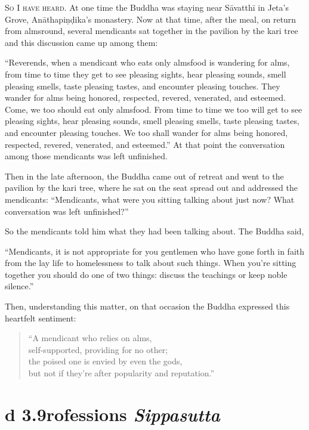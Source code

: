 \documentclass[12pt,openany]{book}%
\newcommand*{\suttatitleacronym}[1]{\smaller[2]{#1}\vspace*{.3em}}
\newcommand*{\suttatitletranslation}[1]{\linebreak{#1}}
\newcommand*{\suttatitleroot}[1]{\linebreak\smaller[2]\itshape{#1}}
\newcommand*{\tocacronym}[1]{\hspace*{-3.3em}{#1}\quad}
\newcommand*{\toctranslation}[1]{#1}
\newcommand*{\tocroot}[1]{(\textit{#1})}
\newcommand*{\scevam}[1]{\textsc{#1}}
\begin{document}
\scevam{So I have heard. }At one time the Buddha was staying near \textsanskrit{Sāvatthī} in Jeta’s Grove, \textsanskrit{Anāthapiṇḍika}’s monastery. Now at that time, after the meal, on return from almsround, several mendicants sat together in the pavilion by the kari tree and this discussion came up among them: 

“Reverends, when a mendicant who eats only almsfood is wandering for alms, from time to time they get to see pleasing sights, hear pleasing sounds, smell pleasing smells, taste pleasing tastes, and encounter pleasing touches. They wander for alms being honored, respected, revered, venerated, and esteemed. Come, we too should eat only almsfood. From time to time we too will get to see pleasing sights, hear pleasing sounds, smell pleasing smells, taste pleasing tastes, and encounter pleasing touches. We too shall wander for alms being honored, respected, revered, venerated, and esteemed.” At that point the conversation among those mendicants was left unfinished. 

Then in the late afternoon, the Buddha came out of retreat and went to the pavilion by the kari tree, where he sat on the seat spread out and addressed the mendicants: “Mendicants, what were you sitting talking about just now? What conversation was left unfinished?” 

So the mendicants told him what they had been talking about. The Buddha said, 

“Mendicants, it is not appropriate for you gentlemen who have gone forth in faith from the lay life to homelessness to talk about such things. When you’re sitting together you should do one of two things: discuss the teachings or keep noble silence.” 

Then, understanding this matter, on that occasion the Buddha expressed this heartfelt sentiment: 

\begin{verse}%
“A mendicant who relies on alms, \\
self-supported, providing for no other; \\
the poised one is envied by even the gods, \\
but not if they’re after popularity and reputation.” 

%
\end{verse}

%
\section*{{\suttatitleacronym Ud 3.9}{\suttatitletranslation Professions }{\suttatitleroot Sippasutta}}
\addcontentsline{toc}{section}{\tocacronym{Ud 3.9} \toctranslation{Professions } \tocroot{Sippasutta}}
\end{document}
